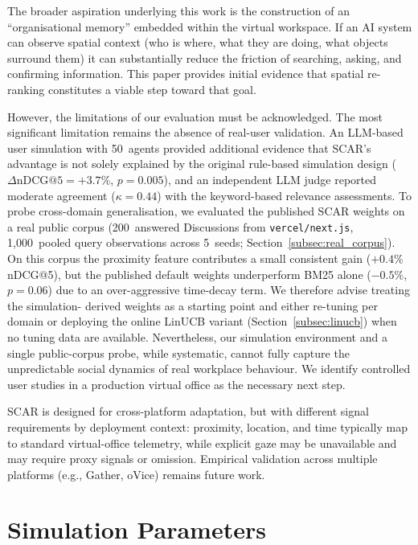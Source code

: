 \documentclass[journal]{IEEEtran}
\begin{document}
The broader aspiration underlying this work is the construction of an ``organisational memory'' embedded within the virtual workspace.
If an AI system can observe spatial context (who is where, what they are doing, what objects surround them) it can substantially reduce the friction of searching, asking, and confirming information.
This paper provides initial evidence that spatial re-ranking constitutes a viable step toward that goal.

However, the limitations of our evaluation must be acknowledged.
The most significant limitation remains the absence of real-user validation.
An LLM-based user simulation with 50~agents provided additional evidence that
SCAR's advantage is not solely explained by the original rule-based simulation
design ($\Delta\text{nDCG@5} = +3.7\%$, $p = 0.005$), and an independent LLM
judge reported moderate agreement ($\kappa = 0.44$) with the keyword-based
relevance assessments. To probe cross-domain generalisation, we evaluated the
published SCAR weights on a real public corpus (200~answered Discussions
from \texttt{vercel/next.js}, 1{,}000~pooled query observations across 5~seeds;
Section~\ref{subsec:real_corpus}). On this corpus the proximity feature
contributes a small consistent gain ($+0.4\%$ nDCG@5), but the published
default weights underperform BM25 alone ($-0.5\%$, $p = 0.06$) due to an
over-aggressive time-decay term. We therefore advise treating the simulation-
derived weights as a starting point and either re-tuning per domain or
deploying the online LinUCB variant (Section~\ref{subsec:linucb}) when no
tuning data are available.
Nevertheless, our simulation environment and a single public-corpus probe,
while systematic, cannot fully capture the unpredictable social dynamics of
real workplace behaviour. We identify controlled user studies in a production
virtual office as the necessary next step.

SCAR is designed for cross-platform adaptation, but with different signal requirements by deployment context: proximity, location, and time typically map to standard virtual-office telemetry, while explicit gaze may be unavailable and may require proxy signals or omission. Empirical validation across multiple platforms (e.g., Gather, oVice) remains future work.

\appendix

\section{Simulation Parameters}
\label{app:sim_params}
\end{document}
